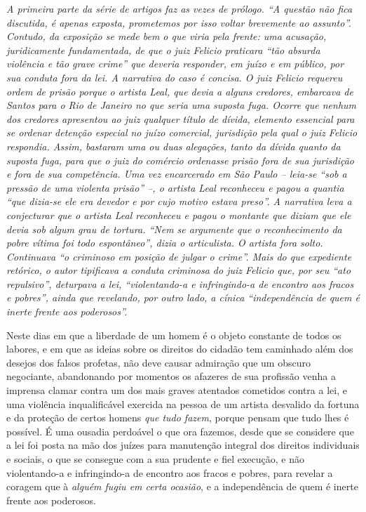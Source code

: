\begin{didascalia}
\emph{A primeira parte da série de artigos faz as vezes de prólogo. ``A
questão não fica discutida, é apenas exposta, prometemos por isso voltar
brevemente ao assunto''. Contudo, da exposição se mede bem o que viria
pela frente: uma acusação, juridicamente fundamentada, de que o juiz
Felicio praticara ``tão absurda violência e tão grave crime'' que deveria
responder, em juízo e em público, por sua conduta fora da lei. A
narrativa do caso é concisa. O juiz Felicio requereu ordem de prisão
porque o artista Leal, que devia a alguns credores, embarcava de Santos
para o Rio de Janeiro no que seria uma suposta fuga. Ocorre que nenhum
dos credores apresentou ao juiz qualquer título de dívida, elemento
essencial para se ordenar detenção especial no juízo comercial,
jurisdição pela qual o juiz Felicio respondia. Assim, bastaram uma ou
duas alegações, tanto da dívida quanto da suposta fuga, para que o juiz
do comércio ordenasse prisão fora de sua jurisdição e fora de sua
competência. Uma vez encarcerado em São Paulo -- leia-se ``sob a pressão
de uma violenta prisão'' --, o artista Leal reconheceu e pagou a quantia
``que dizia-se ele era devedor e por cujo motivo estava preso''. A
narrativa leva a conjecturar que o artista Leal reconheceu e pagou o
montante que diziam que ele devia sob algum grau de tortura. ``Nem se
argumente que o reconhecimento da pobre vítima foi todo espontâneo'',
dizia o articulista. O artista fora solto. Continuava ``o criminoso em
posição de julgar o crime''. Mais do que expediente retórico, o autor
tipificava a conduta criminosa do juiz Felicio que, por seu ``ato
repulsivo'', deturpava a lei, ``violentando-a e infringindo-a de encontro
aos fracos e pobres'', ainda que revelando, por outro lado, a cínica
``independência de quem é inerte frente aos poderosos''.}
\end{didascalia}


Neste dias em que a liberdade de um homem é o objeto constante de todos
os labores, e em que as ideias sobre os direitos do cidadão tem
caminhado além dos desejos dos falsos profetas, não deve causar
admiração que um obscuro negociante, abandonando por momentos os
afazeres de sua profissão venha a imprensa clamar contra um dos mais
graves atentados cometidos contra a lei, e uma violência inqualificável
exercida na pessoa de um artista desvalido da fortuna e da proteção de
certos homens \emph{que tudo fazem}, porque pensam que tudo lhes é
possível. É uma ousadia perdoável o que ora fazemos, desde que se
considere que a lei foi posta na mão dos juízes para manutenção integral
dos direitos individuais e sociais, o que se consegue com a sua prudente
e fiel execução, e não violentando-a e infringindo-a de encontro aos
fracos e pobres, para revelar a coragem que à \emph{alguém fugiu em
certa ocasião}, e a independência de quem é inerte frente aos poderosos.

